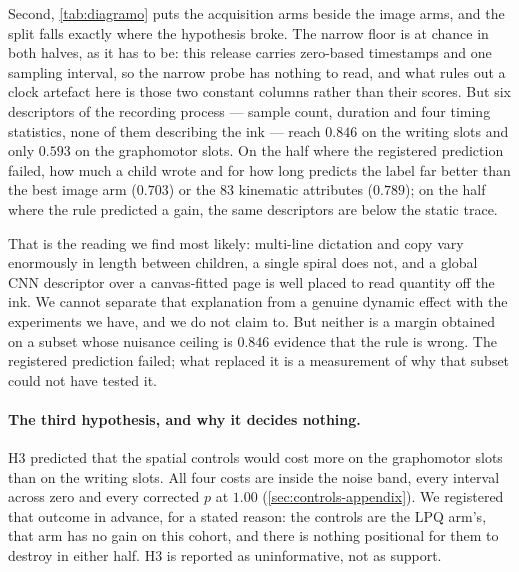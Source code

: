 \documentclass[10pt,a4paper]{article}
\begin{document}
Second, \cref{tab:diagramo} puts the acquisition arms beside the image arms, and the split falls
exactly where the hypothesis broke. The narrow floor is at chance in both halves, as it has to be:
this release carries zero-based timestamps and one sampling interval, so the narrow probe has
nothing to read, and what rules out a clock artefact here is those two constant columns rather than
their scores. But six descriptors of the recording process --- sample count, duration and four
timing statistics, none of them describing the ink --- reach $\mathbf{0.846}$ on the writing slots
and only $0.593$ on the graphomotor slots. On the half where the registered prediction failed, how
much a child wrote and for how long predicts the label far better than the best image arm ($0.703$)
or the $83$ kinematic attributes ($0.789$); on the half
where the rule predicted a gain, the same descriptors are below the static trace.

That is the reading we find most likely: multi-line dictation and copy vary enormously in length
between children, a single spiral does not, and a global CNN descriptor over a canvas-fitted page is
well placed to read quantity off the ink. We cannot separate that explanation from a genuine dynamic
effect with the experiments we have, and we do not claim to. But neither is a margin obtained on a
subset whose nuisance ceiling is $0.846$ evidence that the rule is wrong. The registered
prediction failed; what replaced it is a measurement of why that subset could not have tested it.

\paragraph{The third hypothesis, and why it decides nothing.} H3 predicted that the spatial
controls would cost more on the graphomotor slots than on the writing slots. All four costs are
inside the noise band, every interval across zero and every corrected $p$ at $1.00$
(\cref{sec:controls-appendix}). We registered that outcome in advance, for a stated reason: the
controls are the LPQ arm's, that arm has no gain on this cohort, and there is nothing positional for
them to destroy in either half. H3 is reported as uninformative, not as support.
\end{document}
